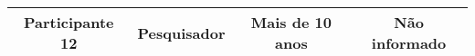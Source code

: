 \begin{table}[htb]
\begin{tabular}{|l|c|c|c|}
\multicolumn{1}{|c|}{Participante 12}                                                 & Pesquisador                                                           & Mais de 10 anos                                                                                   & Não informado                                                                                      \\ \hline
\end{tabular}
\end{table}

\FloatBarrier
